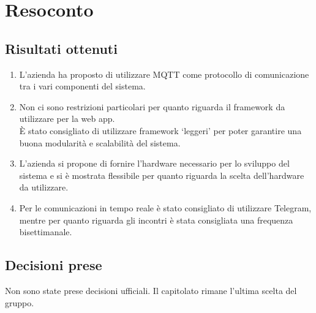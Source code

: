 \section{Resoconto}

\subsection{Risultati ottenuti}
\begin{enumerate}
    \item L'azienda ha proposto di utilizzare MQTT come protocollo di comunicazione tra i vari componenti del sistema.
    \item Non ci sono restrizioni particolari per quanto riguarda il framework da utilizzare per la web app. \\ È stato consigliato di utilizzare framework `leggeri' per poter garantire una buona modularità e scalabilità del sistema.
    \item L'azienda si propone di fornire l'hardware necessario per lo sviluppo del sistema e si è mostrata flessibile per quanto riguarda la scelta dell'hardware da utilizzare.
    \item Per le comunicazioni in tempo reale  è stato consigliato di utilizzare Telegram, mentre per quanto riguarda gli incontri è stata consigliata una frequenza bisettimanale.
\end{enumerate}

\subsection{Decisioni prese}
Non sono state prese decisioni ufficiali. Il capitolato rimane l'ultima scelta del gruppo.
